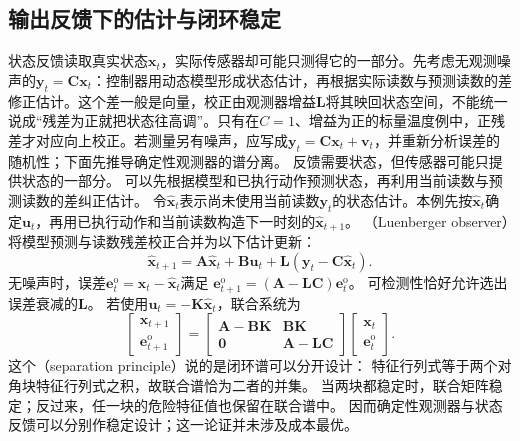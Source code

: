 \subsection{输出反馈下的估计与闭环稳定}
\label{sec:control-output-feedback-stability}
状态反馈读取真实状态\(\bm x_t\)，实际传感器却可能只测得它的一部分。先考虑无观测噪声的\(\bm y_t=\bm C\bm x_t\)：控制器用动态模型形成状态估计，再根据实际读数与预测读数的差修正估计。这个差一般是向量，校正由观测器增益\(\bm L\)将其映回状态空间，不能统一说成“残差为正就把状态往高调”。只有在\(C=1\)、增益为正的标量温度例中，正残差才对应向上校正。若测量另有噪声，应写成\(\bm y_t=\bm C\bm x_t+\bm v_t\)，并重新分析误差的随机性；下面先推导确定性观测器的谱分离。
反馈需要状态，但传感器可能只提供状态的一部分。
可以先根据模型和已执行动作预测状态，再利用当前读数与预测读数的差纠正估计。
令$\widehat{\bm x}_t$表示尚未使用当前读数$\bm y_t$的状态估计。本例先按$\widehat{\bm x}_t$确定$\bm u_t$，再用已执行动作和当前读数构造下一时刻的$\widehat{\bm x}_{t+1}$。
（Luenberger observer）将模型预测与读数残差校正合并为以下估计更新：
\begin{equation}
  \widehat{\bm x}_{t+1}
  =\bm A\widehat{\bm x}_t+\bm B\bm u_t+
    \bm L(\bm y_t-\bm C\widehat{\bm x}_t).
  \label{eq:control-luenberger-observer}
\end{equation}
无噪声时，误差$\bm e_t^{\mathrm o}=\bm x_t-\widehat{\bm x}_t$满足
$\bm e_{t+1}^{\mathrm o}=(\bm A-\bm L\bm C)\bm e_t^{\mathrm o}$。
可检测性恰好允许选出误差衰减的$\bm L$。
若使用$\bm u_t=-\bm K\widehat{\bm x}_t$，联合系统为
\begin{equation}
  \begin{bmatrix}\bm x_{t+1}\\\bm e_{t+1}^{\mathrm o}\end{bmatrix}
  =
  \begin{bmatrix}
    \bm A-\bm B\bm K&\bm B\bm K\\
    \bm0&\bm A-\bm L\bm C
  \end{bmatrix}
  \begin{bmatrix}\bm x_t\\\bm e_t^{\mathrm o}\end{bmatrix}.
  \label{eq:control-separation-block}
\end{equation}
这个（separation principle）说的是闭环谱可以分开设计：
特征行列式等于两个对角块特征行列式之积，故联合谱恰为二者的并集。
当两块都稳定时，联合矩阵稳定；反过来，任一块的危险特征值也保留在联合谱中。
因而确定性观测器与状态反馈可以分别作稳定设计；这一论证并未涉及成本最优。

